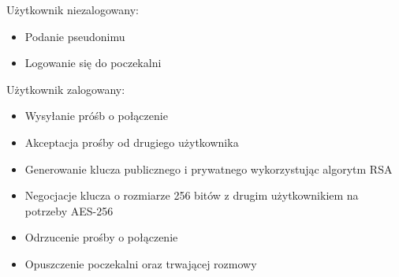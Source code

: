 Użytkownik niezalogowany: 
\begin{itemize}
\item Podanie pseudonimu
\item Logowanie się do poczekalni
\end{itemize}
Użytkownik zalogowany:
\begin{itemize}
	\item Wysyłanie próśb o połączenie
	\item Akceptacja prośby od drugiego użytkownika
	\item Generowanie klucza publicznego i prywatnego wykorzystując algorytm RSA
	\item Negocjacje klucza o rozmiarze 256 bitów z drugim użytkownikiem na potrzeby AES-256
	\item Odrzucenie prośby o połączenie
	\item Opuszczenie poczekalni oraz trwającej rozmowy	
\end{itemize}
